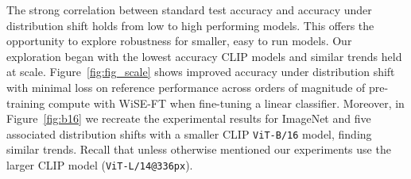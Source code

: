 The strong correlation between standard test accuracy and accuracy under distribution shift holds from low to high performing models.
This offers the opportunity to explore robustness for smaller, easy to run models.
Our exploration began with the lowest accuracy CLIP models and similar trends held at scale.
Figure~\ref{fig:fig_scale} shows improved accuracy under distribution shift with minimal loss on reference performance across orders of magnitude of pre-training compute with WiSE-FT when fine-tuning a linear classifier.
Moreover, in Figure~\ref{fig:b16} we recreate the experimental results for ImageNet and five associated distribution shifts with a smaller CLIP \texttt{ViT-B/16} model, finding similar trends. Recall that unless otherwise mentioned our experiments use the larger CLIP model (\texttt{ViT-L/14@336px}).

\FloatBarrier


